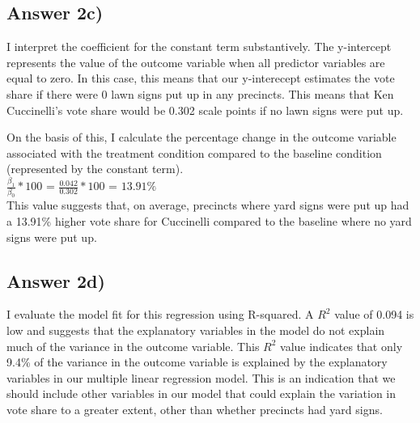 \documentclass{article}
\begin{document}
\subsection{Answer 2c)}
I interpret the coefficient for the constant term substantively.
The y-intercept represents the value of the outcome variable when all predictor variables are equal to zero. In this case, this means that our y-interecept estimates the vote share if there were 0 lawn signs put up in any precincts. This means that Ken Cuccinelli's vote share would be 0.302 scale points if no lawn signs were put up.

On the basis of this, I calculate the percentage change in the outcome variable associated with the treatment condition compared to the baseline condition (represented by the constant term).
\\
$\frac{\beta_1} {\beta_0} * 100$ 
= $\frac{0.042}{0.302} * 100$
= $13.91\%$
\\
This value suggests that, on average, precincts where yard signs were put up had a 13.91\% higher vote share for Cuccinelli compared to the baseline where no yard signs were put up.

\subsection{Answer 2d)}
I evaluate the model fit for this regression using R-squared.
A $R^2$ value of 0.094 is low and suggests that the explanatory variables in the model do not explain much of the variance in the outcome variable. This $R^2$ value indicates that only 9.4\% of the variance in the outcome variable is explained by the explanatory variables in our multiple linear regression model.  
This is an indication that we should include other variables in our model that could explain the variation in vote share to a greater extent, other than whether precincts had yard signs.
\end{document}
